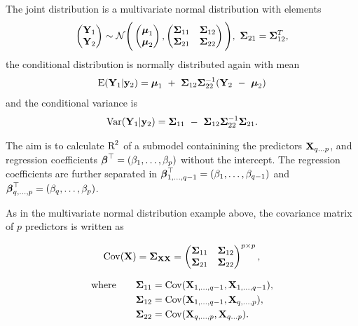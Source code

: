 \documentclass[11pt,a4paper,twoside]{book}\usepackage[]{graphicx}\usepackage[]{color}
\begin{document}
The joint distribution is a multivariate normal distribution with elements
\begin{align*}
\begin{pmatrix}
\mathbf{Y}_{1} \\ 
\mathbf{Y}_{2} \end{pmatrix} \sim \mathcal{N}
\Bigg(\begin{pmatrix}
\boldsymbol{\mu}_{1} \\ 
\boldsymbol{\mu}_{2} 
\end{pmatrix},
\begin{pmatrix}
{\boldsymbol{\Sigma}}{}_{11} & {\boldsymbol{\Sigma}}{}_{12} \\
{\boldsymbol{\Sigma}}{}_{21} & {\boldsymbol{\Sigma}}{}_{22} \\
\end{pmatrix}\Bigg),
\ {\boldsymbol{\Sigma}}{}_{21} = {\boldsymbol{\Sigma}}{}_{12}^{T},
\end{align*}
the conditional distribution is normally distributed again with mean 
\begin{align*}
\E (\mathbf{Y}_{1} | \mathbf{y}_{2} ) = \boldsymbol{\mu}_{1}\ +\ \bSigma_{12} \bSigma_{22}^{-1}(\mathbf{Y}_{2}\ -\ \boldsymbol{\mu}_{2})
\end{align*}
and the conditional variance is
\begin{align}
\operatorname{Var} ( \mathbf{Y}_{1} | \mathbf{y}_{2} ) = {\boldsymbol{\Sigma}}{}_{11}\ -\ {\boldsymbol{\Sigma}}{}_{12} {\boldsymbol{\Sigma}}{}_{22}^{-1}{\boldsymbol{\Sigma}}{}_{21} \text{.} \label{eq:condvar} 
\end{align}

The aim is to calculate $\text{R}^2$ of a submodel containining the predictors ${\mathbf{X}}_{q...p}$, and regression coefficients ${\boldsymbol{\beta}}^\top = (\beta_{1}, \dotsc, \beta_{p})$ without the intercept. The regression coefficients are further separated in ${\boldsymbol{\beta}}^\top_{1  ,\dotsc,  q-1} = (\beta_{1} ,\dotsc, \beta_{q-1})$ and ${\boldsymbol{\beta}}^\top_{q ,\dotsc, p} = (\beta_{q} ,\dotsc, \beta_{p})$. 

As in the multivariate normal distribution example above, the covariance matrix of $p$ predictors is written as 

      \begin{align*} 
\operatorname{Cov}({\mathbf{X}}) =	{\boldsymbol{\Sigma}}{}_{{\mathbf{X}} {\mathbf{X}}} = \begin{pmatrix}
{\boldsymbol{\Sigma}}{}_{11} & {\boldsymbol{\Sigma}}{}_{12} \\
{\boldsymbol{\Sigma}}{}_{21} & {\boldsymbol{\Sigma}}{}_{22}  \\
\end{pmatrix}^{p \times p}, 
   \end{align*}
   
         \begin{align*} 
   \text{where} \qquad {\boldsymbol{\Sigma}}{}_{11} &= \operatorname{Cov}({\mathbf{X}}_{1,\dotsc, q-1}, {\mathbf{X}}_{1 ,\dotsc,q-1}), \\ {\boldsymbol{\Sigma}}{}_{12} &= \operatorname{Cov}({\mathbf{X}}_{1,\dotsc, q-1}, {\mathbf{X}}_{q ,\dotsc, p}),\\ {\boldsymbol{\Sigma}}{}_{22} &= \operatorname{Cov}({\mathbf{X}}_{q ,\dotsc, p}, {\mathbf{X}}_{q \dots p}) \text{.} \nonumber
      \end{align*}
      
\end{document}
